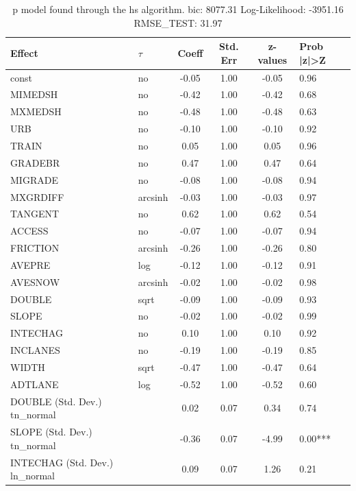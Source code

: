 \begin{table}
	\caption{p model found through the hs algorithm. bic: 8077.31 Log-Likelihood: -3951.16 RMSE_TEST: 31.97}
	\begin{center}
		\begin{tabular}{|l|l|c|c|c|l|}
			\hline
			Effect & $\tau$ & Coeff & Std. Err & z-values & Prob |z|>Z \\
			\hline
			const & no & -0.05 & 1.00 & -0.05 & 0.96 \\
			\hline
			MIMEDSH & no & -0.42 & 1.00 & -0.42 & 0.68 \\
			\hline
			MXMEDSH & no & -0.48 & 1.00 & -0.48 & 0.63 \\
			\hline
			URB & no & -0.10 & 1.00 & -0.10 & 0.92 \\
			\hline
			TRAIN & no & 0.05 & 1.00 & 0.05 & 0.96 \\
			\hline
			GRADEBR & no & 0.47 & 1.00 & 0.47 & 0.64 \\
			\hline
			MIGRADE & no & -0.08 & 1.00 & -0.08 & 0.94 \\
			\hline
			MXGRDIFF & arcsinh & -0.03 & 1.00 & -0.03 & 0.97 \\
			\hline
			TANGENT & no & 0.62 & 1.00 & 0.62 & 0.54 \\
			\hline
			ACCESS & no & -0.07 & 1.00 & -0.07 & 0.94 \\
			\hline
			FRICTION & arcsinh & -0.26 & 1.00 & -0.26 & 0.80 \\
			\hline
			AVEPRE & log & -0.12 & 1.00 & -0.12 & 0.91 \\
			\hline
			AVESNOW & arcsinh & -0.02 & 1.00 & -0.02 & 0.98 \\
			\hline
			DOUBLE & sqrt & -0.09 & 1.00 & -0.09 & 0.93 \\
			\hline
			SLOPE & no & -0.02 & 1.00 & -0.02 & 0.99 \\
			\hline
			INTECHAG & no & 0.10 & 1.00 & 0.10 & 0.92 \\
			\hline
			INCLANES & no & -0.19 & 1.00 & -0.19 & 0.85 \\
			\hline
			WIDTH & sqrt & -0.47 & 1.00 & -0.47 & 0.64 \\
			\hline
			ADTLANE & log & -0.52 & 1.00 & -0.52 & 0.60 \\
			\hline
			DOUBLE (Std. Dev.) tn_normal &  & 0.02 & 0.07 & 0.34 & 0.74 \\
			\hline
			SLOPE (Std. Dev.) tn_normal &  & -0.36 & 0.07 & -4.99 & 0.00*** \\
			\hline
			INTECHAG (Std. Dev.) ln_normal &  & 0.09 & 0.07 & 1.26 & 0.21 \\

\end{tabular}
\end{center}
\end{table}
